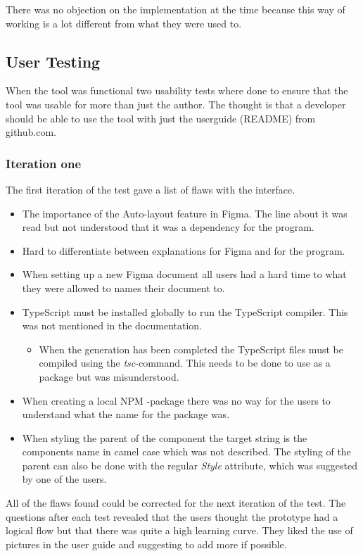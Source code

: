There was no objection on the implementation at the time because this way of working is a lot different from what they were used to.  


\subsection{User Testing}%
\label{sub:User Testing}
When the tool was functional two usability tests where done to ensure that the tool was usable for more than just the author. The thought is that a developer should be able to use the tool with just the userguide (README) from github.com.

\subsubsection{Iteration one}%
\label{ssub:Iteration one}
The first iteration of the test gave a list of flaws with the interface.
\begin{itemize}
   \item The importance of the Auto-layout feature in Figma. The line about it was read but not understood that it was a dependency for the program. 
   \item Hard to differentiate between explanations for Figma and for the program.
   \item When setting up a new Figma document all users had a hard time to what they were allowed to names their document to.
   \item TypeScript must be installed globally to run the TypeScript compiler. This was not mentioned in the documentation. 
      \begin{itemize}
         \item When the generation has been completed the TypeScript files must be compiled using the \textit{tsc}-command. This needs to be done to use as a package but was misunderstood.
      \end{itemize}
   \item When creating a local NPM -package there was no way for the users to understand what the name for the package was. 
   \item When styling the parent of the component the target string is the components name in camel case which was not described. The styling of the parent can also be done with the regular \textit{Style} attribute, which was suggested by one of the users.
\end{itemize}

All of the flaws found could be corrected for the next iteration of the test. The questions after each test revealed that the users thought the prototype had a logical flow but that there was quite a high learning curve. They liked the use of pictures in the user guide and suggesting to add more if possible.  

